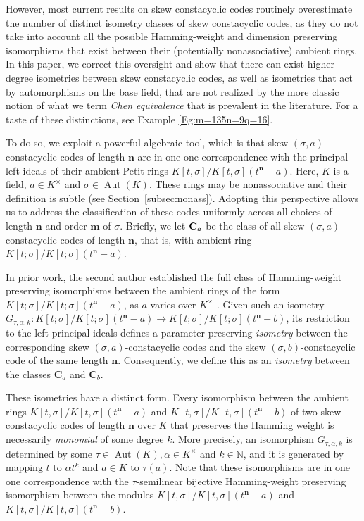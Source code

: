\documentclass[11pt]{amsart}
\theoremstyle{plain}
\theoremstyle{definition}
\numberwithin{equation}{section}
\numberwithin{figure}{section}
\newcommand{\NN}{\mathbb{N}}
\newcommand{\Kone}[1]{K[t;\sigma]/K[t;\sigma](t^{\de}-#1)}
\newcommand{\os}{{\mathbf{m}}}  %
\newcommand{\de}{{\mathbf{n}}}  %
\DeclareMathOperator{\Aut}{Aut}
\begin{document}
However, most current results on skew constacyclic codes routinely overestimate the number of distinct isometry classes of skew constacyclic codes, as they do not take into account all the possible Hamming-weight and dimension  preserving isomorphisms that exist between their (potentially nonassociative) ambient rings.  In this paper, we correct this oversight and show that there can exist higher-degree isometries  between skew constacyclic codes, as well as isometries that act by automorphisms on the base field, that are not realized by the more classic notion of what we term \emph{Chen equivalence} that is prevalent in the literature. For a taste of these distinctions, see Example \ref{Eg:m=135n=9q=16}.

To do so, we exploit a powerful algebraic tool, which is that
skew $(\sigma,a)$-constacyclic codes of length $\de$ are in one-one correspondence with the principal left ideals of their ambient  Petit rings $K[t,\sigma]/K[t,\sigma](t^\de-a)$.  Here, $K$ is a field, $a\in K^\times$ and $\sigma\in \Aut(K)$. These rings may be nonassociative and their definition is subtle (see Section~\ref{subsec:nonass}).  Adopting this perspective allows us to address the classification of these codes uniformly across all choices of length $\de$  and order $\os$ of $\sigma$.  Briefly, we let ${\bf C}_a$ be the class of all skew $(\sigma,a)$-constacyclic codes of length $\de$, that is, with ambient ring $K[t;\sigma]/K[t;\sigma](t^\de-a)$.

In prior work, the second author established the full class of Hamming-weight preserving isomorphisms  between the ambient rings of the form $\Kone{a}$, as $a$ varies over $K^\times$ \cite{Pumpluen2025}.  Given such an isometry $G_{\tau,\alpha,k}: \Kone{a}\to \Kone{b}$, its restriction to the left principal ideals defines a %
parameter-preserving \emph{isometry} between the corresponding skew $(\sigma,a)$-constacyclic codes and the skew $(\sigma,b)$-constacyclic code of the same length $\de$.  Consequently, we define this as an \emph{isometry} between the classes $\mathbf{C}_a$ and $\mathbf{C}_b$.

 These isometries have a distinct form. Every isomorphism between the  ambient rings $K[t,\sigma]/K[t,\sigma](t^\de-a)$ and $K[t,\sigma]/K[t,\sigma](t^\de-b)$ of two skew constacyclic codes of length $\de$ over  $K$  that preserves the Hamming weight is necessarily \emph{monomial} of some degree $k$.  More precisely, an isomorphism $G_{\tau,\alpha,k}$ is determined by some $\tau\in \Aut(K), \alpha\in K^\times$ and $k\in \NN$, and it is generated by mapping $t$ to $\alpha t^k$ and $a\in K$ to $\tau(a)$.   Note that these isomorphisms are in one one correspondence with the $\tau$-semilinear bijective Hamming-weight preserving isomorphism between the modules $K[t,\sigma]/K[t,\sigma](t^\de-a)$ and $K[t,\sigma]/K[t,\sigma](t^\de-b)$.
\end{document}
